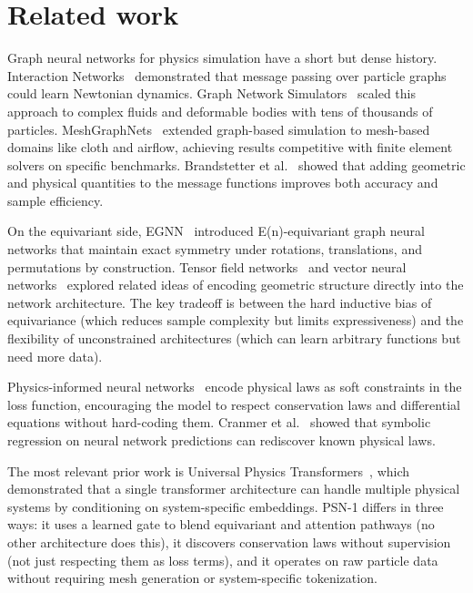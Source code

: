 \documentclass[10pt,twocolumn]{article}
\begin{document}
\section{Related work}

Graph neural networks for physics simulation have a short but dense history. Interaction Networks~\cite{battaglia2016} demonstrated that message passing over particle graphs could learn Newtonian dynamics. Graph Network Simulators~\cite{sanchez2020} scaled this approach to complex fluids and deformable bodies with tens of thousands of particles. MeshGraphNets~\cite{pfaff2021} extended graph-based simulation to mesh-based domains like cloth and airflow, achieving results competitive with finite element solvers on specific benchmarks. Brandstetter et al.~\cite{brandstetter2022} showed that adding geometric and physical quantities to the message functions improves both accuracy and sample efficiency.

On the equivariant side, EGNN~\cite{satorras2021} introduced E(n)-equivariant graph neural networks that maintain exact symmetry under rotations, translations, and permutations by construction. Tensor field networks~\cite{thomas2018} and vector neural networks~\cite{anderson2019} explored related ideas of encoding geometric structure directly into the network architecture. The key tradeoff is between the hard inductive bias of equivariance (which reduces sample complexity but limits expressiveness) and the flexibility of unconstrained architectures (which can learn arbitrary functions but need more data).

Physics-informed neural networks~\cite{raissi2019} encode physical laws as soft constraints in the loss function, encouraging the model to respect conservation laws and differential equations without hard-coding them. Cranmer et al.~\cite{cranmer2020} showed that symbolic regression on neural network predictions can rediscover known physical laws.

The most relevant prior work is Universal Physics Transformers~\cite{liu2023}, which demonstrated that a single transformer architecture can handle multiple physical systems by conditioning on system-specific embeddings. PSN-1 differs in three ways: it uses a learned gate to blend equivariant and attention pathways (no other architecture does this), it discovers conservation laws without supervision (not just respecting them as loss terms), and it operates on raw particle data without requiring mesh generation or system-specific tokenization.
\end{document}
